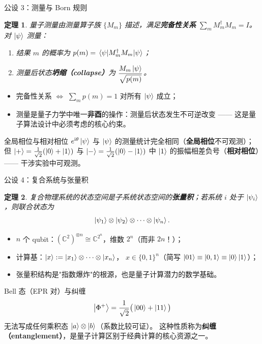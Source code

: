 \documentclass[aspectratio=169,10pt]{ctexbeamer}
\newcommand{\C}{\mathbb{C}}
\newcommand{\ii}{\mathrm{i}}
\newtheorem*{Thm}{定理}
\begin{document}
\begin{frame}{公设 3：测量与 Born 规则}
\begin{Thm}
量子测量由测量算子族 $\{M_m\}$ 描述，满足\textbf{完备性关系}
$\sum_m M_m^\dagger M_m=I$。对 $\ket{\psi}$ 测量：
\begin{enumerate}
\item 结果 $m$ 的概率为 $p(m)=\mel{\psi}{M_m^\dagger M_m}{\psi}$；
\item 测量后状态\textbf{坍缩（collapse）}为 $\dfrac{M_m\ket{\psi}}{\sqrt{p(m)}}$。
\end{enumerate}
\end{Thm}
\begin{itemize}
\item 完备性关系 $\Leftrightarrow$ $\sum_m p(m)=1$ 对所有 $\ket{\psi}$ 成立；
\item 测量是量子力学中唯一\textbf{非酉}的操作：测量后状态发生不可逆改变 ——
这是量子算法设计中必须考虑的核心约束。
\end{itemize}
\begin{keybox}{全局相位与相对相位}
$e^{\ii\theta}\ket{\psi}$ 与 $\ket{\psi}$ 的测量统计完全相同（\textbf{全局相位}不可观测）；
但 $\ket{+}=\tfrac1{\sqrt2}(\ket0+\ket1)$ 与 $\ket{-}=\tfrac1{\sqrt2}(\ket0-\ket1)$
中 $\ket1$ 的振幅相差负号（\textbf{相对相位}）—— 干涉实验中可观测。
\end{keybox}
\end{frame}

\begin{frame}{公设 4：复合系统与张量积}
\begin{Thm}
复合物理系统的状态空间是子系统状态空间的\textbf{张量积}；若系统 $i$ 处于
$\ket{\psi_i}$，则联合状态为
\[
\ket{\psi_1}\otimes\ket{\psi_2}\otimes\cdots\otimes\ket{\psi_n}.
\]
\end{Thm}
\begin{itemize}
\item $n$ 个 qubit：$(\C^2)^{\otimes n}\cong\C^{2^n}$，维数 $2^n$（而非 $2n$！）；
\item 计算基：$\ket{x}:=\ket{x_1}\otimes\cdots\otimes\ket{x_n}$，
$x\in\{0,1\}^n$（简写 $\ket{01}\equiv\ket{0,1}\equiv\ket0\ket1$）；
\item 张量积结构是"指数爆炸"的根源，也是量子计算潜力的数学基础。
\end{itemize}
\begin{exbox}{Bell 态（EPR 对）与纠缠}
\[
\ket{\Phi^+}=\frac1{\sqrt2}\big(\ket{00}+\ket{11}\big)
\]
无法写成任何乘积态 $\ket a\otimes\ket b$（系数比较可证）。
这种性质称为\textbf{纠缠（entanglement）}，是量子计算区别于经典计算的核心资源之一。
\end{exbox}
\end{frame}
\end{document}
